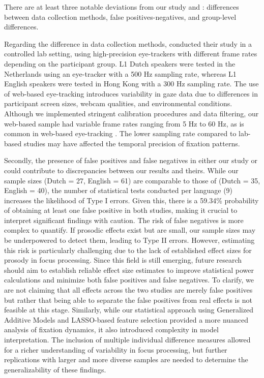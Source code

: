 There are at least three notable deviations from our study and \textcite{ge2021a}: differences between data collection methods, false positives-negatives, and group-level differences. 

Regarding the difference in data collection methods, \cite{ge2021a} conducted their study in a controlled lab setting, using high-precision eye-trackers with different frame rates depending on the participant group. L1 Dutch speakers were tested in the Netherlands using an eye-tracker with a 500 Hz sampling rate, whereas L1 English speakers were tested in Hong Kong with a 300 Hz sampling rate. The use of web-based eye-tracking introduces variability in gaze data due to differences in participant screen sizes, webcam qualities, and environmental conditions. Although we implemented stringent calibration procedures and data filtering, our web-based sample had variable frame rates ranging from 5 Hz to 60 Hz, as is common in web-based eye-tracking \parencite{Vos_2022,AOW}. The lower sampling rate compared to lab-based studies may have affected the temporal precision of fixation patterns.

Secondly, the presence of false positives and false negatives in either our study or \textcite{ge2021a} could contribute to discrepancies between our results and theirs. While our sample sizes (Dutch = 27, English = 61) are comparable to those of \textcite{ge2021a} (Dutch = 35, English = 40), the number of statistical tests conducted per language (9) increases the likelihood of Type I errors. Given this, there is a 59.34\% probability of obtaining at least one false positive in both studies, making it crucial to interpret significant findings with caution. The risk of false negatives is more complex to quantify. If prosodic effects exist but are small, our sample sizes may be underpowered to detect them, leading to Type II errors. However, estimating this risk is particularly challenging due to the lack of established effect sizes for prosody in focus processing. Since this field is still emerging, future research should aim to establish reliable effect size estimates to improve statistical power calculations and minimize both false positives and false negatives. To clarify, we are not claiming that all effects across the two studies are merely false positives but rather that being able to separate the false positives from real effects is not feasible at this stage. Similarly, while our statistical approach using Generalized Additive Models and LASSO-based feature selection provided a more nuanced analysis of fixation dynamics, it also introduced complexity in model interpretation. The inclusion of multiple individual difference measures allowed for a richer understanding of variability in focus processing, but further replications with larger and more diverse samples are needed to determine the generalizability of these findings.


